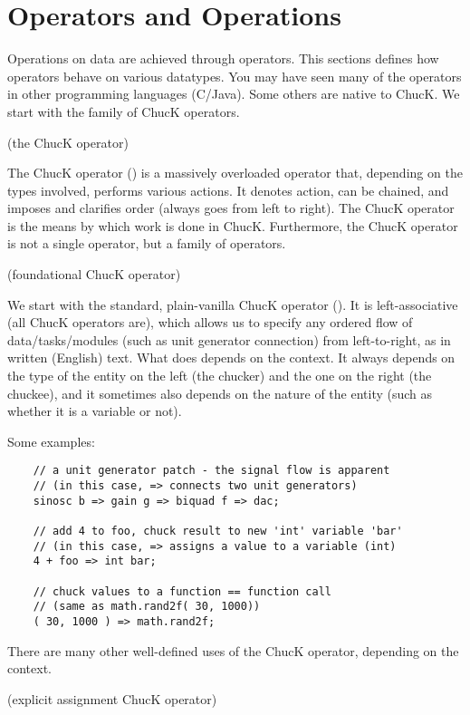 \chapter{Operators and Operations}

Operations on data are achieved through operators. This sections defines how operators behave on various datatypes. You may have seen many of the operators in other programming languages (C/Java). Some others are native to ChucK. We start with the family of ChucK operators.

 

\chuckop (the ChucK operator)

The ChucK operator (\chuckop) is a massively overloaded operator that, depending on the types involved, performs various actions. It denotes action, can be chained, and imposes and clarifies order (always goes from left to right). The ChucK operator is the means by which work is done in ChucK. Furthermore, the ChucK operator is not a single operator, but a family of operators.

\chuckop (foundational ChucK operator)

We start with the standard, plain-vanilla ChucK operator (\chuckop). It is left-associative (all ChucK operators are), which allows us to specify any ordered flow of data/tasks/modules (such as unit generator connection) from left-to-right, as in written (English) text.  What \chuckop does depends on the context. It always depends on the type of the entity on the left (the chucker) and the one on the right (the chuckee), and it sometimes  also depends on the nature of the entity (such as whether it is a variable or not).

Some examples:
\begin{verbatim}
    // a unit generator patch - the signal flow is apparent
    // (in this case, => connects two unit generators)
    sinosc b => gain g => biquad f => dac;

    // add 4 to foo, chuck result to new 'int' variable 'bar'
    // (in this case, => assigns a value to a variable (int)
    4 + foo => int bar;

    // chuck values to a function == function call
    // (same as math.rand2f( 30, 1000))
    ( 30, 1000 ) => math.rand2f;
\end{verbatim}

There are many other well-defined uses of the ChucK operator, depending on the context.

\atchuckop (explicit assignment ChucK operator)

